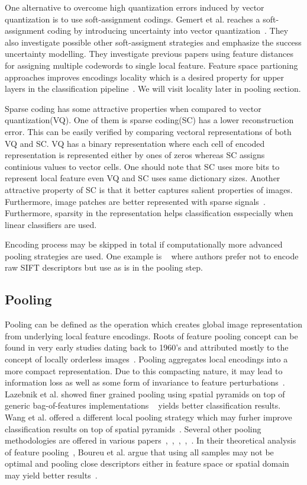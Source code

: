 \documentclass[conference]{IEEEtran}
\begin{document}
One alternative to overcome high quantization errors induced by vector quantization is to use soft-assignment codings. Gemert et al. reaches a soft-assignment coding by introducing uncertainty into vector quantization~\cite{5128909}. They also investigate possible other soft-assigment strategies and emphasize the success uncertainty modelling. They investigate previous papers using feature distances for assigning multiple codewords to single local feature. Feature space partioning approaches improves encodings locality which is a desired property for upper layers in the classification pipeline~\cite{Avila2013453}. We will visit locality later in pooling section.

Sparse coding has some attractive properties when compared to vector quantization(VQ). One of them is sparse coding(SC) has a lower reconstruction error. This can be easily verified by comparing vectoral representations of both VQ and SC. VQ has a binary representation where each cell of encoded representation is represented either by ones of zeros whereas SC assigns continious values to vector cells. One should note that SC uses more bits to represent local feature even VQ and SC uses same dictionary sizes. Another attractive property of SC is that it better captures salient properties of images. Furthermore, image patches are better represented with sparse signals~\cite{5539963}. Furthermore, sparsity in the representation helps classification esspecially when linear classifiers are used\cite{6248076}.

Encoding process may be skipped in total if computationally more advanced pooling strategies are used. One example is ~\cite{SecondOrderPooling} where authors prefer not to encode raw SIFT descriptors but use as is in the pooling step.

\subsection {Pooling}

Pooling can be defined as the operation which creates global image representation from underlying local feature encodings\cite{6248076}. Roots of feature pooling concept can be found in very early studies dating back to 1960's and attributed mostly to the concept of locally orderless images~\cite{boureau2010theoretical}. Pooling aggregates local encodings into a more compact representation. Due to this compacting nature, it may lead to information loss as well as some form of invariance to feature perturbations~\cite{6909713}. Lazebnik et al. showed finer grained pooling using spatial pyramids on top of generic bag-of-features implementations ~\cite{1238663} yields better classification results. Wang et al. offered a different local pooling strategy which may furher improve classification results on top of spatial pyramids~\cite{5540018}. Several other pooling methodologies are offered in various papers~\cite{Avila2013453},~\cite{6126555},~\cite{ObjectCentricPooling},~\cite{6248076},~\cite{SecondOrderPooling}. In their theoretical analysis of feature pooling~\cite{boureau2010theoretical}, Boureu et al. argue that using all samples may not be optimal and pooling close descriptors either in feature space or spatial domain may yield better results~\cite{6909713}.
\end{document}
